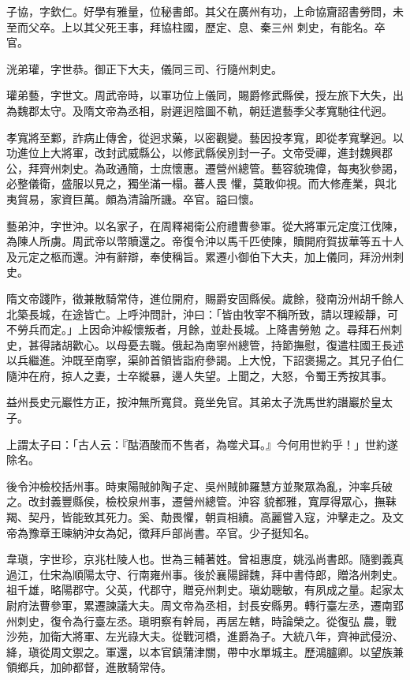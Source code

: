\begin{pinyinscope}
 子協，字欽仁。好學有雅量，位秘書郎。其父在廣州有功，上命協齎詔書勞問，未至而父卒。上以其父死王事，拜協柱國，歷定、息、秦三州
 刺史，有能名。卒官。



 洸弟瓘，字世恭。御正下大夫，儀同三司、行隨州刺史。



 瓘弟藝，字世文。周武帝時，以軍功位上儀同，賜爵修武縣侯，授左旅下大失，出為魏郡太守。及隋文帝為丞相，尉遲迥陰圖不軌，朝廷遣藝季父孝寬馳往代迥。



 孝寬將至鄴，詐病止傳舍，從迥求藥，以密觀變。藝因投孝寬，即從孝寬擊迥。以功進位上大將軍，改封武威縣公，以修武縣侯別封一子。文帝受禪，進封魏興郡公，拜齊州刺史。為政通簡，士庶懷惠。遷營州總管。藝容貌瑰偉，每夷狄參謁，必整儀衛，盛服以見之，獨坐滿一榻。蕃人畏
 懼，莫敢仰視。而大修產業，與北夷貿易，家資巨萬。頗為清論所譏。卒官。謚曰懷。



 藝弟沖，字世沖。以名家子，在周釋褐衛公府禮曹參軍。從大將軍元定度江伐陳，為陳人所虜。周武帝以幣贖還之。帝復令沖以馬千匹使陳，贖開府賀拔華等五十人及元定之柩而還。沖有辭辯，奉使稱旨。累遷小御伯下大夫，加上儀同，拜汾州刺史。



 隋文帝踐阼，徵兼散騎常侍，進位開府，賜爵安固縣侯。歲餘，發南汾州胡千餘人北築長城，在途皆亡。上呼沖問計，沖曰：「皆由牧宰不稱所致，請以理綏靜，可不勞兵而定。」上因命沖綏懷叛者，月餘，並赴長城。上降書勞勉
 之。尋拜石州刺史，甚得諸胡歡心。以母憂去職。俄起為南寧州總管，持節撫慰，復遣柱國王長述以兵繼進。沖既至南寧，渠帥首領皆詣府參謁。上大悅，下詔褒揚之。其兄子伯仁隨沖在府，掠人之妻，士卒縱暴，邊人失望。上聞之，大怒，令蜀王秀按其事。



 益州長史元巖性方正，按沖無所寬貸。竟坐免官。其弟太子洗馬世約譖巖於皇太子。



 上謂太子曰：「古人云：『酤酒酸而不售者，為噬犬耳。』今何用世約乎！」世約遂除名。



 後令沖檢校括州事。時東陽賊帥陶子定、吳州賊帥羅慧方並聚眾為亂，沖率兵破之。改封義豐縣侯，檢校泉州事，遷營州總管。沖容
 貌都雅，寬厚得眾心，撫靺羯、契丹，皆能致其死力。奚、勣畏懼，朝貢相續。高麗嘗入寇，沖擊走之。及文帝為豫章王暕納沖女為妃，徵拜戶部尚書。卒官。少子挺知名。



 韋瑱，字世珍，京兆杜陵人也。世為三輔著姓。曾祖惠度，姚泓尚書郎。隨劉義真過江，仕宋為順陽太守、行南雍州事。後於襄陽歸魏，拜中書侍郎，贈洛州刺史。祖千雄，略陽郡守。父英，代郡守，贈兗州刺史。瑱幼聰敏，有夙成之量。起家太尉府法曹參軍，累遷諫議大夫。周文帝為丞相，封長安縣男。轉行臺左丞，遷南郢州刺史，復令為行臺左丞。瑱明察有幹局，再居左轄，時論榮之。從復弘
 農，戰沙苑，加衛大將軍、左光祿大夫。從戰河橋，進爵為子。大統八年，齊神武侵汾、絳，瑱從周文禦之。軍還，以本官鎮蒲津關，帶中水單城主。歷鴻臚卿。以望族兼領鄉兵，加帥都督，進散騎常侍。




\end{pinyinscope}
